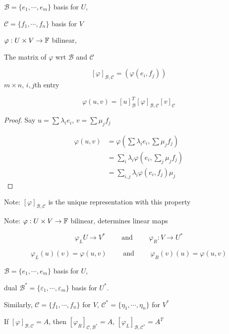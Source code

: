 \documentclass[a4paper]{article}
\begin{document}
\begin{defi}
	$ \mathcal{B} = \{ e_{1},\cdots,e_{m} \} $ basis for $ U $,
	
	$ \mathcal{C} = \{ f_{1},\cdots,f_{n} \} $ basis for $ V $
	
	
	$ \varphi : U \times V \to \mathbb{F} $ bilinear,
	
	The matrix of $ \varphi $ wrt $ \mathcal{B} $ and $ \mathcal{C} $ 
	
	\[ [\varphi]_{\mathcal{B},\mathcal{C}} = \left(  \varphi(e_{i},f_{j}) \right)  \] $ m \times n $, $ i,j $th entry
\end{defi}


\begin{lemma} 
	\[ \varphi(u,v) = [u]_{\mathcal{B}}^{T} [\varphi]_{\mathcal{B},\mathcal{C}} [ v]_{\mathcal{C}} \]
\end{lemma}


\begin{proof}
	Say $ u = \sum \lambda_{i} e_{i} $, $ v = \sum \mu_{j} f_{j} $
	
	
	\begin{align*}
	\varphi(u,v) & = \varphi \left( \sum \lambda_{i} e_{i}, \sum \mu_{j} f_{j} \right)  \\
	& = \sum_{i} \lambda_{i} \varphi(e_{i},\sum_{j} \mu_{j}f_{j}) \\
	& = \sum_{i,j} \lambda_{i} \varphi(e_{i},f_{j}) \mu_{j} 
	\end{align*}
\end{proof}

Note: $ [\varphi]_{\mathcal{B},\mathcal{C}} $ is the unique representation with this property

Note: $ \varphi: U \times V \to \mathbb{F} $ bilinear, determines linear maps 

\[ \varphi_{L} U \to V^{*} \qquad \text{ and } \qquad \varphi_{R} : V \to U^{*} \]

\[ \varphi_{L}(u)(v) = \varphi(u,v) \qquad \text{ and } \qquad \varphi_{R}(v)(u) = \varphi(u,v) \]


\begin{lemma} 
	$ \mathcal{B} = \{ e_{1},\cdots,e_{m} \} $ basis for $ U $,
	
	dual $ \mathcal{B}^{*} = \{ \varepsilon_{1},\cdots,\varepsilon_{m} \} $ basis for $ U^{*} $.
	
	Similarly, $ \mathcal{C} = \{ f_{1},\cdots,f_{n} \} $ for $ V $,
	$ \mathcal{C}^{*} = \{  \eta_{1},\cdots,\eta_{n} \} $ for $ V^{*} $
	                                                                                                  
	                                                                                                  
	If $ [ \varphi ]_{\mathcal{B},\mathcal{C}} = A $, then $ [ \varphi_{R} ]_{\mathcal{C},\mathcal{B}^{*}}  = A$,  $ [ \varphi_{L}]_{\mathcal{B},\mathcal{C}^{*}} = A^{T} $
	
	 
\end{lemma}
\end{document}
